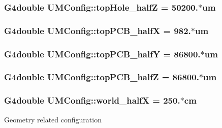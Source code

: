 \subsubsection[{top\+Hole\+\_\+half\+Z}]{\setlength{\rightskip}{0pt plus 5cm}G4double U\+M\+Config\+::top\+Hole\+\_\+half\+Z = 50200.$\ast$um}\label{structUMConfig_ab90829b627e0674333d365671c58cbb3}
\hypertarget{structUMConfig_a11a04ed6303378bb1f6121ae786d4805}{}
\subsubsection[{top\+P\+C\+B\+\_\+half\+X}]{\setlength{\rightskip}{0pt plus 5cm}G4double U\+M\+Config\+::top\+P\+C\+B\+\_\+half\+X = 982.$\ast$um}\label{structUMConfig_a11a04ed6303378bb1f6121ae786d4805}
\hypertarget{structUMConfig_a33a3c114dd5c4e32308c808729bb30c3}{}
\subsubsection[{top\+P\+C\+B\+\_\+half\+Y}]{\setlength{\rightskip}{0pt plus 5cm}G4double U\+M\+Config\+::top\+P\+C\+B\+\_\+half\+Y = 86800.$\ast$um}\label{structUMConfig_a33a3c114dd5c4e32308c808729bb30c3}
\hypertarget{structUMConfig_a9b94de55cce711aedf3d05c17af0afb2}{}
\subsubsection[{top\+P\+C\+B\+\_\+half\+Z}]{\setlength{\rightskip}{0pt plus 5cm}G4double U\+M\+Config\+::top\+P\+C\+B\+\_\+half\+Z = 86800.$\ast$um}\label{structUMConfig_a9b94de55cce711aedf3d05c17af0afb2}
\hypertarget{structUMConfig_ac785a055563940563f77ff0bbef41d9d}{}
\subsubsection[{world\+\_\+half\+X}]{\setlength{\rightskip}{0pt plus 5cm}G4double U\+M\+Config\+::world\+\_\+half\+X = 250.$\ast$cm}\label{structUMConfig_ac785a055563940563f77ff0bbef41d9d}
Geometry related configuration \hypertarget{structUMConfig_af679f960918ff62d3cee8a9981ffdc2c}{}
